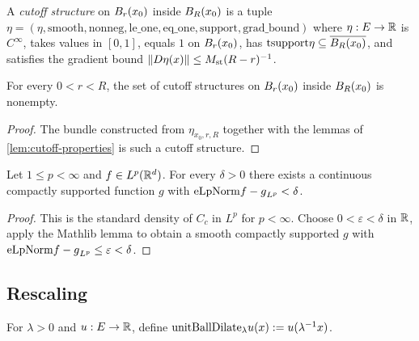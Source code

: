 \begin{definition}
\label{def:Cutoff}
\leanok
{}
A \emph{cutoff structure} on $B_{r}(x_0)$ inside $B_{R}(x_0)$ is a tuple
$\eta = (\eta, \mathrm{smooth}, \text{nonneg}, \text{le\_one}, \text{eq\_one},
\text{support}, \text{grad\_bound})$ where $\eta : E \to \mathbb{R}$ is
$C^\infty$, takes values in $[0,1]$, equals $1$ on $B_{r}(x_0)$, has
$\mathrm{tsupport} \eta \subseteq \overline{B_{R}(x_0)}$, and satisfies the
gradient bound $\|D\eta(x)\| \le M_{\mathrm{st}} (R-r)^{-1}$.
\end{definition}

\begin{theorem}
\label{thm:Cutoff_exists}
\leanok
{}
For every $0 < r < R$, the set of cutoff structures on $B_{r}(x_0)$ inside
$B_{R}(x_0)$ is nonempty.
\end{theorem}

\begin{proof}
\leanok
{}

The bundle constructed from $\eta_{x_0,r,R}$ together with the lemmas of
\ref{lem:cutoff-properties} is such a cutoff structure.
\end{proof}

\begin{theorem}
\label{thm:lp-approx-cc}
\leanok
Let $1 \le p < \infty$ and $f \in L^{p}(\mathbb{R}^d)$. For every $\delta > 0$ there
exists a continuous compactly supported function $g$ with
$\mathrm{eLpNorm}{f-g}_{L^p} < \delta$.
\end{theorem}

\begin{proof}
\leanok

This is the standard density of $C_c$ in $L^p$ for $p < \infty$. Choose
$0 < \varepsilon < \delta$ in $\mathbb{R}$, apply the Mathlib lemma
 to obtain a smooth compactly supported
$g$ with $\mathrm{eLpNorm}{f-g}_{L^p} \le \varepsilon < \delta$.
\end{proof}

\subsection*{Rescaling}

\begin{definition}
\label{def:unitBallDilate}
\leanok
For $\lambda > 0$ and $u : E \to \mathbb{R}$, define
$\mathrm{unitBallDilate}_\lambda u(x) := u(\lambda^{-1} x)$.
\end{definition}

